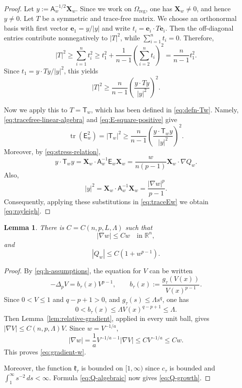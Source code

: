 \documentclass[reqno,12pt]{amsart}
\numberwithin{equation}{section}
\newtheorem{lem}[thm]{Lemma}
\theoremstyle{remark}
\newcommand{\R}{\mathbb R}
\newcommand{\dd}{\,d}
\newcommand{\tr}{\operatorname{tr}}
\newcommand{\Xbf}{\mathbf X}
\begin{document}
\begin{proof}
Let $y:=\mathsf A_w^{-1/2}\Xbf_w$. Since we work on $\Omega_{\mathrm{reg}}$, one has
$\mathbf X_w\ne 0$, and hence $y\ne0$.
Let $T$ be a symmetric and trace-free matrix. We choose an orthonormal basis with first vector ${\mathbf e}_1=y/|y|$ and write $t_i={\mathbf e}_i\cdot T{\mathbf e}_i$.  Then the off-diagonal entries contribute nonnegatively to $|T|^2$, while $\sum_{i=1}^nt_i=0$.  Therefore,  
$$
 |T|^2\ge \sum_{i=1}^nt_i^2  \ge t_1^2+\frac1{n-1}\left(\sum_{i=2}^nt_i\right)^2  =\frac n{n-1}t_1^2.
$$
Since $t_1=y\cdot Ty/|y|^2$, this yields
\begin{equation}\label{eq:tracefree-linear-algebra}
|T|^2\ge\frac n{n-1} \left(\frac{y\cdot Ty}{|y|^2}\right)^2.
\end{equation}

Now we apply this to $T=\mathsf T_w$, which has been defined in \eqref{eq:defn-Tw}.  
Namely,  \eqref{eq:tracefree-linear-algebra} and
\eqref{eq:E-square-positive} give
\begin{equation}\label{eq:traceEw}
    \tr (\mathsf E_w^2) = |\mathsf T_w|^2\ge \frac n{n-1} \left(\frac{y\cdot \mathsf T_wy}{|y|^2}\right)^2. 
\end{equation}
Moreover, by \eqref{eq:stress-relation},
$$
 y\cdot\mathsf T_wy =\Xbf_w\cdot\mathsf A_w^{-1}\mathsf E_w\Xbf_w  =\frac{w}{n(p-1)}\Xbf_w\cdot\nabla Q_w.
$$
Also,
$$
 |y|^2  =\Xbf_w\cdot\mathsf A_w^{-1}\Xbf_w
 =\frac{|\nabla w|^p}{p-1}.
$$
Consequently, applying these substitutions in \eqref{eq:traceEw} we obtain \eqref{eq:rayleigh}.
\end{proof}


\begin{lem}
There is $C=C(n,p,L,\Lambda)$ such that
\begin{equation}\label{eq:gradient-w}
|\nabla w|\le Cw  \quad\text{in }\R^n,
\end{equation}
and
\begin{equation}\label{eq:Q-growth}
|Q_w|\le C(1+w^{p-1}).
\end{equation}
\end{lem}

\begin{proof}
By \eqref{eq:h-assumptions}, the equation for $V$ can be written
$$
-\Delta_pV=b_\tau(x)V^{p-1},\qquad    b_\tau(x):=\frac{g_\tau(V(x))}{V(x)^{p-1}}.
$$
Since $0<V\le 1$ and $q-p+1>0$, and
$g_\tau(s)\le\Lambda s^q$, one has
$$
0<b_\tau(x) \le\Lambda V(x)^{q-p+1} \le\Lambda.
$$
Then Lemma~\ref{lem:relative-gradient}, applied in every unit ball, gives $|\nabla V|\le C(n,p,\Lambda)V$.  Since $w=V^{-1/a}$,
$$
|\nabla w| =\frac1aV^{-1/a-1}|\nabla V|\le CV^{- 1/a}\le Cw.
$$
This proves \eqref{eq:gradient-w}.

Moreover, the function $\mathfrak k_\tau$ is bounded on $[1,\infty)$ since $c_\tau$ is bounded and $\int_1^\infty s^{-2}\dd s<\infty$.  Formula \eqref{eq:Q-algebraic} now gives \eqref{eq:Q-growth}.
\end{proof}
\end{document}
